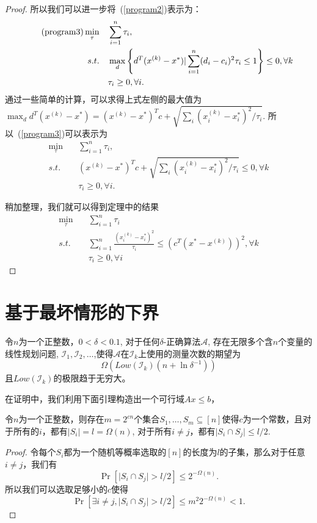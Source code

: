 \begin{proof}
所以我们可以进一步将~(\ref{program2})表示为：
\begin{align}
\tag{program3} \min_\tau \quad & \sum_{i=1}^n \tau_i,\\
        s.t.\quad & \max_d \left\{ d^T (x^{(k)} - x^*) {\Large|} \sum_{i=1}^n (d_i-c_i)^2 \tau_i \le 1\right\}  \le 0, \forall k \notag \\
         &\tau_i\ge 0, \forall i. \notag
 \end{align}
通过一些简单的计算，可以求得上式左侧的最大值为$\max_d d^T (x^{(k)} - x^*) = (x^{(k)} - x^*)^T c + \sqrt{\sum_i (x^{(k)}_i - x^*_i)^2/\tau_i}$. 
所以~(\ref{program3})可以表示为
\begin{align*}
  \min_\tau \quad & \sum_{i=1}^n \tau_i,\\
        s.t.\quad & (x^{(k)} - x^*)^T c + \sqrt{\sum_i (x^{(k)}_i - x^*_i)^2/\tau_i}  \le 0, \forall k\\
         &\tau_i\ge 0, \forall i. 
 \end{align*}

稍加整理，我们就可以得到定理中的结果
\begin{align*}
         \min_\tau \quad & \sum_{i=1}^n \tau_i\\
        s.t.\quad & \sum_{i=1}^n \frac{(x_i^{(k)} -x_i^*)^2}{\tau_i} \le \left( c^T (x^* - x^{(k)}) \right)^2, \forall k\\
         &\tau_i\ge 0, \forall i
\end{align*}
\end{proof}

\section{基于最坏情形的下界}


    \begin{theorem}
        令$n$为一个正整数，$0<\delta<0.1$, 对于任何$\delta$-正确算法$\mathcal{A}$, 存在无限多个含$n$个变量的线性规划问题, $\mathcal{I}_1, \mathcal{I}_2, \dots$,使得$\mathcal{A}$在$\mathcal{I}_k$上使用的测量次数的期望为
        \[
        \Omega\left(Low(\mathcal{I}_k)(n+\ln \delta^{-1}) \right)
        \]
        且$Low(\mathcal{I}_k)$的极限趋于无穷大。
    \end{theorem}
 在证明中，我们利用下面引理构造出一个可行域$Ax\le b$，
 \begin{lemma}\label{mSets}
 令$n$为一个正整数，则存在$m=2^{cn}$个集合$S_1,\dots,S_m \subseteq [n]$使得$c$为一个常数，且对于所有的$i$，都有$\vert S_i \vert = l = \Omega(n)$, 对于所有$i\neq j$，都有$\vert S_i \cap S_j\vert \le l/2$.
 \end{lemma}
  \begin{proof}
  令每个$S_i$都为一个随机等概率选取的$[n]$的长度为$l$的子集，那么对于任意$i\neq j$，我们有
  \[
  \Pr[\vert S_i \cap S_j \vert > l/2]\le 2^{-\Omega(n)}.
  \]
  所以我们可以选取足够小的$c$使得
  \[
  \Pr[\exists i\neq j, \vert S_i \cap S_j \vert > l/2]\le m^2 2^{-\Omega(n)}< 1.
  \]
  \end{proof}
  
